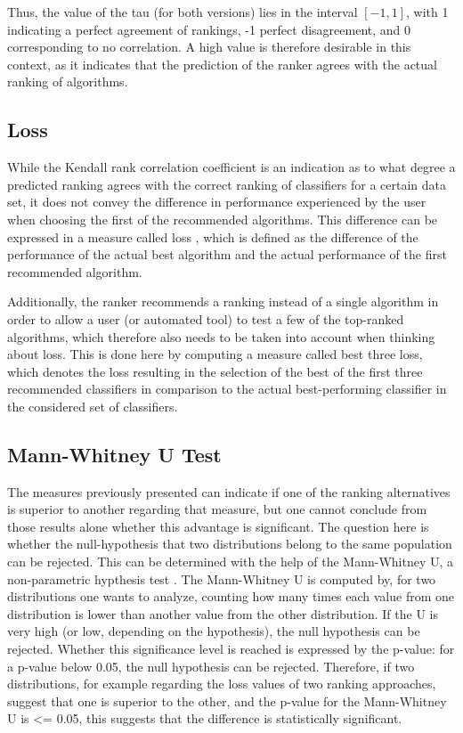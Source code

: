 Thus, the value of the tau (for both versions) lies in the interval $[-1,1]$, with 1 indicating a perfect agreement of rankings, -1 perfect disagreement, and 0 corresponding to no correlation. A high value is therefore desirable in this context, as it indicates that the prediction of the ranker agrees with the actual ranking of algorithms.

\subsection{Loss}
While the Kendall rank correlation coefficient is an indication as to what degree a predicted ranking agrees with the correct ranking of classifiers for a certain data set, it does not convey the difference in performance experienced by the user when choosing the first of the recommended algorithms. This difference can be expressed in a measure called loss \cite{DBLP:conf/mldm/LeiteBV12}, which is defined as the difference of the performance of the actual best algorithm and the actual performance of the first recommended algorithm. 

Additionally, the ranker recommends a ranking instead of a single algorithm in order to allow a user (or automated tool) to test a few of the top-ranked algorithms, which therefore also needs to be taken into account when thinking about loss. This is done here by computing a measure called best three loss, which denotes the loss resulting in the selection of the best of the first three recommended classifiers in comparison to the actual best-performing classifier in the considered set of classifiers. 

\subsection{Mann-Whitney U Test}
The measures previously presented can indicate if one of the ranking alternatives is superior to another regarding that measure, but one cannot conclude from those results alone whether this advantage is significant. The question here is whether the null-hypothesis that two distributions belong to the same population can be rejected. This can be determined with the help of the Mann-Whitney U, a non-parametric hypthesis test \cite{mann1947test}. The Mann-Whitney U is computed by, for two distributions one wants to analyze, counting how many times each value from one distribution is lower than another value from the other distribution. If the U is very high (or low, depending on the hypothesis), the null hypothesis can be rejected. Whether this significance level is reached is expressed by the p-value: for a p-value below 0.05, the null hypothesis can be rejected. Therefore, if two distributions, for example regarding the loss values of two ranking approaches, suggest that one is superior to the other, and the p-value for the Mann-Whitney U is <= 0.05, this suggests that the difference is statistically significant.
